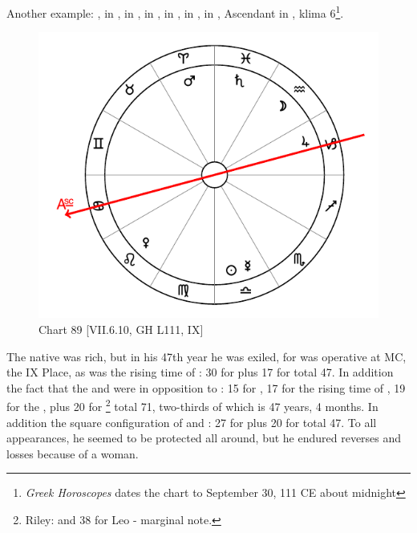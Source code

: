 Another example: \Sun, \Mercury\xspace in \Libra, \Moon\xspace in \Aquarius, \Saturn\xspace in \Pisces, \Jupiter\xspace in \Capricorn,
\Mars\xspace in \Aries, \Venus\xspace in \Leo, Ascendant in \Cancer, klima 6\footnote{\textit{Greek Horoscopes} dates the chart to September 30, 111 CE about midnight}.

\begin{figure}
\centering
\vspace{0pt}
\includegraphics[width=.68\textwidth]{charts/7_6_10}
\caption{Chart 89 [VII.6.10, GH L111, IX] }
\label{fig:chart89}
\end{figure} 

The native was rich, but in his 47th year he was exiled, for \Saturn\xspace was operative at MC, the IX Place, as was the rising time of \Pisces: 30 for \Saturn\xspace plus 17 for \Pisces\xspace total 47. In addition the fact that the \Sun\xspace and \Mercury\xspace were in opposition to \Mars\xspace <was operative>: 15 for \Mars, 17 for the rising time of \Aries, 19 for the \Sun, plus 20 for \Mercury\xspace\footnote{Riley: and 38 for Leo - marginal note.} total 71, two-thirds of which is 47 years, 4 months. In addition the square configuration of \Libra\xspace and \Capricorn\xspace <was operative>: 27 for \Capricorn\xspace plus 20 for \Libra\xspace total 47. To all appearances, he seemed to be protected all around, but he endured reverses and losses because of a woman.

